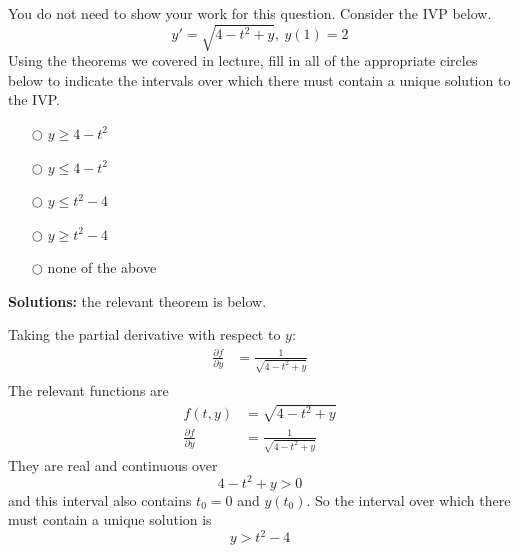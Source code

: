 \ifnum {}
\question[1] You do not need to show your work for this question. Consider the IVP below.
$$\displaystyle y' = \sqrt{4-t^2+y}, \ y(1) = 2$$   
Using the theorems we covered in lecture, fill in all of the appropriate circles below to indicate the intervals over which there must contain a unique solution to the IVP. 
\begin{itemize}
    \item[$\bigcirc$] $y \ge 4-t^2$
    \item[$\bigcirc$] $y \le 4-t^2$
    \item[$\bigcirc$] $y \le t^2-4$
    \item[$\bigcirc$] $y \ge t^2-4$
    \item[$\bigcirc$] none of the above
\end{itemize}
\ifnum {} {\color{DarkBlue} 
\textbf{Solutions:} the relevant theorem is below. 

    \begin{center}\end{center}
    
    Taking the partial derivative with respect to $y$:
\begin{align}
    \frac{\partial f}{\partial y} &= \frac{1}{\sqrt{4-t^2+y}}\\
\end{align}
The relevant functions are 
\begin{align}
    f(t,y) &= \sqrt{4-t^2+y} \\
    \frac{\partial f}{\partial y} &= \frac{1}{\sqrt{4-t^2+y}}
\end{align}
They are real and continuous over $$4-t^2+y > 0$$ and this interval also contains $t_0 = 0$ and $y(t_0)$. So the interval over which there must contain a unique solution is $$y > t^2-4$$ 
} 
\else 
\fi
\fi 




